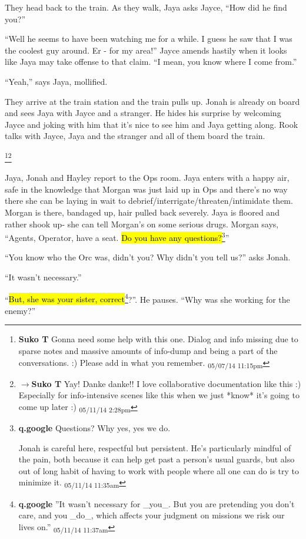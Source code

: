 They head back to the train.  As they walk, Jaya asks Jayce, ``How did he find you?''

``Well he seems to have been watching me for a while.  I guess he saw that I was the coolest guy around.  Er - for my area!'' Jayce amends hastily when it looks like Jaya may take offense to that claim.  ``I mean, you know where I come from.''

``Yeah,'' says Jaya, mollified.



They arrive at the train station and the train pulls up.  Jonah is already on board and sees Jaya with Jayce and a stranger.  He hides his surprise by welcoming Jayce and joking with him that it's nice to see him and Jaya getting along.  Rook talks with Jayce, Jaya and the stranger and all of them board the train.


\footnote{\textbf{Suko T }Gonna need some help with this one.  Dialog and info missing due to sparse notes and massive amounts of info-dump and being a part of the conversations. :)  Please add in what you remember. \textsubscript{05/07/14 11:15pm}}\footnote{$\rightarrow$\textbf{Suko T }Yay!  Danke danke!!  I love collaborative documentation like this :)  Especially for info-intensive scenes like this when we just *know* it's going to come up later :) \textsubscript{05/11/14 2:28pm}}

Jaya, Jonah and Hayley report to the Ops room.  Jaya enters with a happy air, safe in the knowledge that Morgan was just laid up in Ops and there's no way there she can be laying in wait to debrief/interrigate/threaten/intimidate them.  Morgan is there, bandaged up, hair pulled back severely.  Jaya is floored and rather shook up- she can tell Morgan's on some serious drugs.  Morgan says, ``Agents, Operator, have a seat.  \hl{Do you have any questions?}\footnote{\textbf{q.google }Questions?  Why yes, yes we do.

Jonah is careful here, respectful but persistent.  He's particularly mindful of the pain, both because it can help get past a person's usual guards, but also out of long habit of having to work with people where all one can do is try to minimize it. \textsubscript{05/11/14 11:35am}}''

``You know who the Orc was, didn't you?  Why didn't you tell us?'' asks Jonah.

``It wasn't necessary.''

``\hl{But, she was your sister, correct}\footnote{\textbf{q.google }''It wasn't necessary for \_you\_.  But you are pretending you don't care, and you \_do\_, which affects your judgment on missions we risk our lives on.'' \textsubscript{05/11/14 11:37am}}?''.  He pauses. ``Why was she working for the enemy?''

